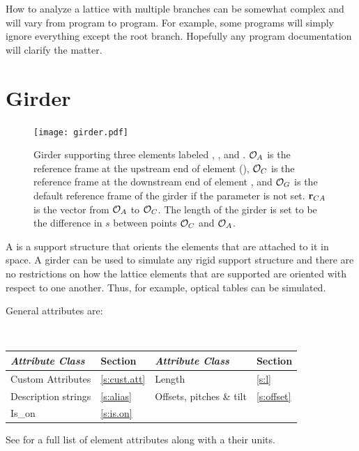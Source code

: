 How to analyze a lattice with multiple branches can be somewhat complex and will vary from program
to program. For example, some programs will simply ignore everything except the root branch. Hopefully
any program documentation will clarify the matter.

\newpage

\section{Girder}
\label{s:girder}

\begin{figure}[t]
  \centering
  \texttt{[image: girder.pdf]}
  \caption[Girder example.] {
Girder supporting three elements labeled , , and .  ${\cal O}_A$ is the reference
frame at the upstream end of element  (), ${\cal O}_C$ is the reference
frame at the downstream end of element , and ${\cal O}_G$ is the default  reference
frame of the girder if the  parameter is not set. ${\bf r}_{CA}$ is the vector from
${\cal O}_A$ to ${\cal O}_C$. The length  of the girder is set to be the difference in $s$ between
points ${\cal O}_C$ and ${\cal O}_A$.
  }
  \label{f:girder}
\end{figure}

A  is a support structure that orients the elements that are attached to it in space. A
girder can be used to simulate any rigid support structure and there are no restrictions on how the
lattice elements that are supported are oriented with respect to one another.  Thus, for example,
optical tables can be simulated.

General  attributes are:
\begin{center}
\tt
\begin{tabular}{llll} \toprule
  {\sl Attribute Class}      & Section           & {\sl Attribute Class}      & Section         \\ \midrule
  Custom Attributes          & \ref{s:cust.att}  & Length                     & \ref{s:l}       \\
  Description strings        & \ref{s:alias}     & Offsets, pitches \& tilt   & \ref{s:offset}  \\ 
  Is_on                      & \ref{s:is.on}     &                            &                 \\
  \bottomrule
\end{tabular}
\end{center}
\toffset
See  for a full list of element attributes along with a their units.

